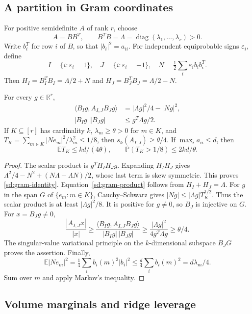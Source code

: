 \subsection{A partition in Gram coordinates}
For positive semidefinite $A$ of rank $r$, choose
\[
 A=BB^T,\qquad B^TB=\Lambda
 =\operatorname{diag}(\lambda_1,\ldots,\lambda_r)>0.
\]
Write $b_i^T$ for row $i$ of $B$, so that $|b_i|^2=a_{ii}$.
For independent equiprobable signs $\varepsilon_i$, define
\[
 I=\{i:\varepsilon_i=1\},\quad J=\{i:\varepsilon_i=-1\},\quad
 N=\tfrac12\sum_i\varepsilon_i b_ib_i^T.
\]
Then $H_I=B_I^TB_I=\Lambda/2+N$ and
$H_J=B_J^TB_J=\Lambda/2-N$.

\begin{lemma}\label{sd:partition-identity}
For every $g\in\mathbb R^r$,
\begin{align}
 \langle B_Ig,A_{I,J}B_Jg\rangle
 &=|\Lambda g|^2/4-|Ng|^2,\label{sd:gram-identity}\\
 |B_Ig|\,|B_Jg|&\leq g^T\Lambda g/2.\label{sd:gram-product}
\end{align}
If $K\subseteq[r]$ has cardinality $k$, $\lambda_m\geq\theta>0$
for $m\in K$, and
$T_K=\sum_{m\in K}|Ne_m|^2/\lambda_m^2\leq1/8$, then
$s_k(A_{I,J})\geq\theta/4$.
If $\max_i a_{ii}\leq d$, then
\[
 \mathbb ET_K\leq kd/(4\theta),\qquad
 \mathbb P(T_K>1/8)\leq2kd/\theta.
\]
\end{lemma}

\begin{proof}
The scalar product is $g^TH_IH_Jg$.  Expanding $H_IH_J$ gives
$\Lambda^2/4-N^2+(N\Lambda-\Lambda N)/2$, whose last term is
skew symmetric.  This proves \eqref{sd:gram-identity}.
Equation~\eqref{sd:gram-product} follows from $H_I+H_J=\Lambda$.
For $g$ in the span $G$ of $\{e_m:m\in K\}$,
Cauchy--Schwarz gives $|Ng|\leq|\Lambda g|T_K^{1/2}$.
Thus the scalar product is at least $|\Lambda g|^2/8$.
It is positive for $g\ne0$, so $B_J$ is injective on $G$.
For $x=B_Jg\ne0$,
\[
 \frac{|A_{I,J}x|}{|x|}
 \geq\frac{\langle B_Ig,A_{I,J}B_Jg\rangle}{|B_Ig|\,|B_Jg|}
 \geq\frac{|\Lambda g|^2}{4g^T\Lambda g}\geq\theta/4.
\]
The singular-value variational principle on the $k$-dimensional
subspace $B_JG$ proves the assertion.  Finally,
\[
 \mathbb E|Ne_m|^2
 =\tfrac14\sum_i b_i(m)^2|b_i|^2
 \leq\tfrac d4\sum_i b_i(m)^2=d\lambda_m/4.
\]
Sum over $m$ and apply Markov's inequality.
\end{proof}

\subsection{Volume marginals and ridge leverage}

